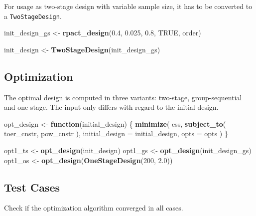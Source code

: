 \documentclass[]{book}
\newenvironment{Shaded}{\begin{snugshade}}{\end{snugshade}}
\newcommand{\ControlFlowTok}[1]{\textcolor[rgb]{0.13,0.29,0.53}{\textbf{#1}}}
\newcommand{\DataTypeTok}[1]{\textcolor[rgb]{0.13,0.29,0.53}{#1}}
\newcommand{\DecValTok}[1]{\textcolor[rgb]{0.00,0.00,0.81}{#1}}
\newcommand{\FloatTok}[1]{\textcolor[rgb]{0.00,0.00,0.81}{#1}}
\newcommand{\KeywordTok}[1]{\textcolor[rgb]{0.13,0.29,0.53}{\textbf{#1}}}
\newcommand{\NormalTok}[1]{#1}
\newcommand{\OtherTok}[1]{\textcolor[rgb]{0.56,0.35,0.01}{#1}}
\newcommand{\StringTok}[1]{\textcolor[rgb]{0.31,0.60,0.02}{#1}}
\begin{document}
For usage as two-stage design with variable sample size, it has to
be converted to a \texttt{TwoStageDesign}.

\begin{Shaded}
\begin{Highlighting}[]
\NormalTok{init_design_gs <-}\StringTok{ }\KeywordTok{rpact_design}\NormalTok{(}\FloatTok{0.4}\NormalTok{, }\FloatTok{0.025}\NormalTok{, }\FloatTok{0.8}\NormalTok{, }\OtherTok{TRUE}\NormalTok{, order)}

\NormalTok{init_design    <-}\StringTok{ }\KeywordTok{TwoStageDesign}\NormalTok{(init_design_gs)}
\end{Highlighting}
\end{Shaded}

\hypertarget{optimization}{%
\subsection{Optimization}\label{optimization}}

The optimal design is computed in three variants: two-stage, group-sequential
and one-stage.
The input only differs with regard to the initial design.

\begin{Shaded}
\begin{Highlighting}[]
\NormalTok{opt_design <-}\StringTok{ }\ControlFlowTok{function}\NormalTok{(initial_design) \{}
    \KeywordTok{minimize}\NormalTok{(}
\NormalTok{        ess,}
        \KeywordTok{subject_to}\NormalTok{(}
\NormalTok{            toer_cnstr,}
\NormalTok{            pow_cnstr}
\NormalTok{        ),}
        \DataTypeTok{initial_design =}\NormalTok{ initial_design,}
        \DataTypeTok{opts =}\NormalTok{ opts}
\NormalTok{    )}
\NormalTok{\}}

\NormalTok{opt1_ts <-}\StringTok{ }\KeywordTok{opt_design}\NormalTok{(init_design)}
\NormalTok{opt1_gs <-}\StringTok{ }\KeywordTok{opt_design}\NormalTok{(init_design_gs)}
\NormalTok{opt1_os <-}\StringTok{ }\KeywordTok{opt_design}\NormalTok{(}\KeywordTok{OneStageDesign}\NormalTok{(}\DecValTok{200}\NormalTok{, }\FloatTok{2.0}\NormalTok{))}
\end{Highlighting}
\end{Shaded}

\hypertarget{test-cases}{%
\subsection{Test Cases}\label{test-cases}}

Check if the optimization algorithm converged in all cases.
\end{document}
